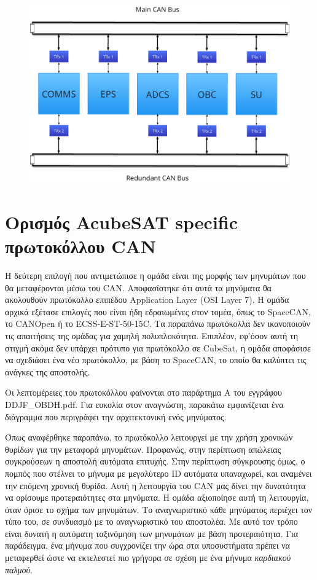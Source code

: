 \documentclass[a4paper,nobib,justified]{tufte-book}
\begin{document}
\begin{figure}[ht]
	\includegraphics{media/diagrams/subsystems-on-buses.pdf}
	\label{fig:dual-buses}
	\cite{DDJF_OBDH}
\end{figure}


\section{Ορισμός AcubeSAT specific πρωτοκόλλου CAN}
Η δεύτερη επιλογή που αντιμετώπισε η ομάδα είναι της μορφής των μηνυμάτων που θα μεταφέρονται μέσω του CAN. Αποφασίστηκε ότι αυτά τα μηνύματα θα ακολουθούν πρωτόκολλο επιπέδου Application Layer (OSI Layer 7). Η ομάδα αρχικά εξέτασε επιλογές που είναι ήδη εδραιωμένες στον τομέα, όπως το SpaceCAN, το CANOpen ή το ECSS-E-ST-50-15C. Τα παραπάνω πρωτόκολλα δεν ικανοποιούν τις απαιτήσεις της ομάδας για χαμηλή πολυπλοκότητα. Επιπλέον, εφ'όσον αυτή τη στιγμή ακόμα δεν υπάρχει πρότυπο για πρωτόκολλο σε CubeSat, η ομάδα αποφάσισε να σχεδιάσει ένα νέο πρωτόκολλο, με βάση το SpaceCAN, το οποίο θα καλύπτει τις ανάγκες της αποστολής.

Οι λεπτομέρειες του πρωτοκόλλου φαίνονται στο παράρτημα Α του εγγράφου DDJF\_OBDH.pdf. Για ευκολία στον αναγνώστη, παρακάτω εμφανίζεται ένα διάγραμμα που περιγράφει την αρχιτεκτονική ενός μηνύματος.


Όπως αναφέρθηκε παραπάνω, το πρωτόκολλο λειτουργεί με την χρήση χρονικών θυρίδων για την μεταφορά μηνυμάτων. Προφανώς, στην περίπτωση απώλειας συγκρούσεων η αποστολή αυτόματα επιτυχής. Στην περίπτωση σύγκρουσης όμως, ο πομπός που στέλνει το μήνυμα με μεγαλύτερο ID αυτόματα υπαναχωρεί, και αναμένει την επόμενη χρονική θυρίδα. Αυτή η λειτουργία του CAN μας δίνει την δυνατότητα να ορίσουμε προτεραιότητες στα μηνύματα. Η ομάδα αξιοποίησε αυτή τη λειτουργία, όταν όρισε το σχήμα των μηνυμάτων. Το αναγνωριστικό κάθε μηνύματος περιέχει τον τύπο του, σε συνδυασμό με το αναγνωριστικό του αποστολέα. Με αυτό τον τρόπο είναι δυνατή η αυτόματη ταξινόμηση των μηνυμάτων με βάση προτεραιότητα. Για παράδειγμα, ένα μήνυμα που συγχρονίζει την ώρα στα υποσυστήματα πρέπει να μεταφερθεί ώστε να εκτελεστεί πιο γρήγορα σε σχέση με ένα μήνυμα \textit{καρδιακού παλμού}.
\end{document}
